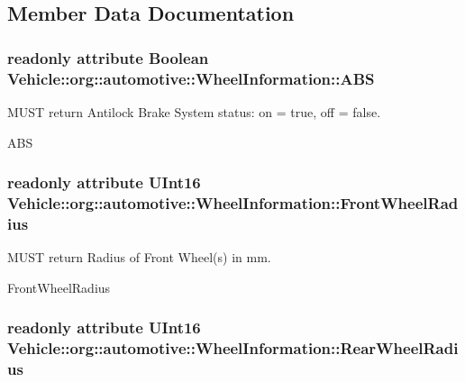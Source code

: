 \subsection{Member Data Documentation}
\hypertarget{interfaceVehicle_1_1org_1_1automotive_1_1WheelInformation_a3c7ac6fd667c722ff87406a43a06bd4f}{
\subsubsection[{A\-B\-S}]{\setlength{\rightskip}{0pt plus 5cm}readonly attribute Boolean Vehicle\-::org\-::automotive\-::\-Wheel\-Information\-::\-A\-B\-S}}\label{interfaceVehicle_1_1org_1_1automotive_1_1WheelInformation_a3c7ac6fd667c722ff87406a43a06bd4f}


M\-U\-S\-T return Antilock Brake System status\-: on = true, off = false. 

A\-B\-S \hypertarget{interfaceVehicle_1_1org_1_1automotive_1_1WheelInformation_ad169af8bc66ddf49363e347256908b1e}{
\subsubsection[{Front\-Wheel\-Radius}]{\setlength{\rightskip}{0pt plus 5cm}readonly attribute U\-Int16 Vehicle\-::org\-::automotive\-::\-Wheel\-Information\-::\-Front\-Wheel\-Radius}}\label{interfaceVehicle_1_1org_1_1automotive_1_1WheelInformation_ad169af8bc66ddf49363e347256908b1e}


M\-U\-S\-T return Radius of Front Wheel(s) in mm. 

Front\-Wheel\-Radius \hypertarget{interfaceVehicle_1_1org_1_1automotive_1_1WheelInformation_acbb560b02e11b83a66b4abaa056466a1}{
\subsubsection[{Rear\-Wheel\-Radius}]{\setlength{\rightskip}{0pt plus 5cm}readonly attribute U\-Int16 Vehicle\-::org\-::automotive\-::\-Wheel\-Information\-::\-Rear\-Wheel\-Radius}}\label{interfaceVehicle_1_1org_1_1automotive_1_1WheelInformation_acbb560b02e11b83a66b4abaa056466a1}


